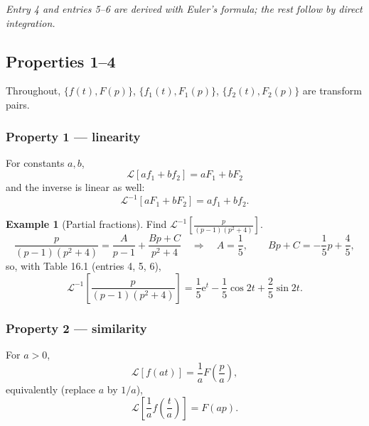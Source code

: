 \documentclass[11pt,a4paper]{article}
\theoremstyle{definition}
\newtheorem{example}{Example}[section]
\theoremstyle{plain}
\begin{document}
\noindent\textit{Entry 4 and entries 5--6 are derived with Euler's formula; the rest follow by
direct integration.}

\clearpage
\subsection{Properties 1--4}

Throughout, $\{f(t),F(p)\}$, $\{f_1(t),F_1(p)\}$, $\{f_2(t),F_2(p)\}$ are transform pairs.

\subsubsection{Property 1 --- linearity}

For constants $a,b$,
\begin{equation}
\mathcal{L}\left[a f_1+b f_2\right]=aF_1+bF_2 \tag{16.17}
\end{equation}
and the inverse is linear as well:
\begin{equation}
\mathcal{L}^{-1}\left[aF_1+bF_2\right]=a f_1+b f_2 . \tag{16.18}
\end{equation}

\begin{example}[Partial fractions]
Find $\mathcal{L}^{-1}\left[\frac{p}{(p-1)(p^{2}+4)}\right]$.
\begin{equation*}
\frac{p}{(p-1)(p^{2}+4)}=\frac{A}{p-1}+\frac{Bp+C}{p^{2}+4}
\quad\Longrightarrow\quad A=\frac{1}{5},\qquad Bp+C=-\frac{1}{5}p+\frac{4}{5},
\end{equation*}
so, with Table 16.1 (entries 4, 5, 6),
\begin{equation}
\mathcal{L}^{-1}\left[\frac{p}{(p-1)(p^{2}+4)}\right]
=\frac{1}{5}\mathrm{e}^{t}-\frac{1}{5}\cos 2t+\frac{2}{5}\sin 2t . \tag{16.19}
\end{equation}
\end{example}

\subsubsection{Property 2 --- similarity}

For $a>0$,
\begin{equation}
\mathcal{L}\left[f(at)\right]=\frac{1}{a}F\!\left(\frac{p}{a}\right), \tag{16.20}
\end{equation}
equivalently (replace $a$ by $1/a$),
\begin{equation}
\mathcal{L}\left[\frac{1}{a}f\!\left(\frac{t}{a}\right)\right]=F(ap). \tag{16.21}
\end{equation}
\end{document}
